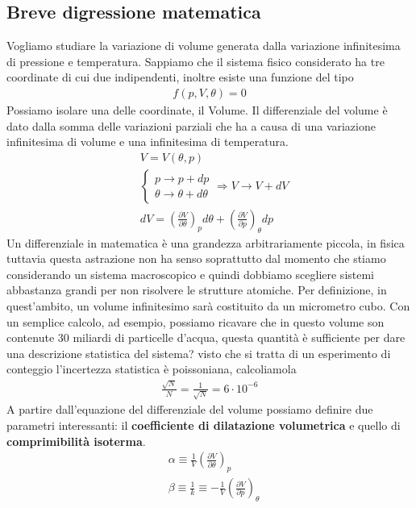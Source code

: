 \documentclass[10pt,a4paper]{article}
\begin{document}
\subsection{Breve digressione matematica}
Vogliamo studiare la variazione di volume generata dalla variazione infinitesima di pressione e temperatura. Sappiamo che il sistema fisico considerato ha tre coordinate di cui due indipendenti, inoltre esiste una funzione del tipo
\begin{align*} 
	f(p, V, \theta) = 0
\end{align*} 
Possiamo isolare una delle coordinate, il Volume. Il differenziale del volume è dato dalla somma delle variazioni parziali che ha a causa di una variazione infinitesima di volume e una infinitesima di temperatura. 
\begin{align*} 
	&V = V(\theta, p)\\
	&\begin{cases}
		p\rightarrow p + dp\\
		\theta \rightarrow \theta + d\theta
	\end{cases} \Rightarrow V \rightarrow V + dV\\
	&dV = (\frac{\partial V}{\partial \theta})_p d\theta + (\frac{\partial V}{\partial p})_{\theta} dp
\end{align*} 
Un differenziale in matematica è una grandezza arbitrariamente piccola, in fisica tuttavia questa astrazione non ha senso soprattutto dal momento che stiamo considerando un sistema macroscopico e quindi dobbiamo scegliere sistemi abbastanza grandi per non risolvere le  strutture atomiche. Per definizione, in quest'ambito, un volume infinitesimo sarà costituito da un micrometro cubo. Con un semplice calcolo, ad esempio, possiamo ricavare che in questo volume son contenute 30 miliardi di particelle d'acqua, questa quantità è sufficiente per dare una descrizione statistica del sistema? visto che si tratta di un esperimento di conteggio l'incertezza statistica è poissoniana, calcoliamola
\begin{align*} 
	\frac{\sqrt{N}}{N} = \frac{1}{\sqrt{N}} = 6 \cdot 10^{-6}
\end{align*} 
A partire dall'equazione del differenziale del volume possiamo definire due parametri interessanti: il \textbf{coefficiente di dilatazione volumetrica} e quello di \textbf{comprimibilità isoterma}.
\begin{align*} 
	&\alpha \equiv \frac{1}{V}( \frac{\partial V}{\partial \theta})_p\\
	&\beta \equiv \frac{1}{k} \equiv - \frac{1}{V}( \frac{\partial V}{\partial p})_{\theta}
\end{align*} 
\end{document}
